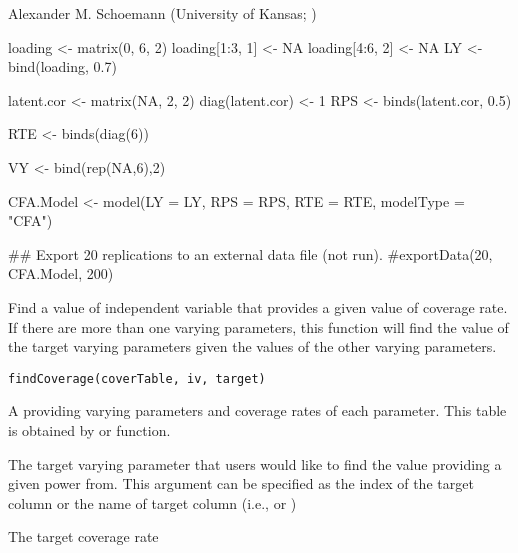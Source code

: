 \documentclass[a4paper]{book}
\begin{document}
%
\begin{Author}\relax
	
Alexander M. Schoemann (University of Kansas; ) 
\end{Author}
%
\begin{Examples}
\begin{ExampleCode}
loading <- matrix(0, 6, 2)
loading[1:3, 1] <- NA
loading[4:6, 2] <- NA
LY <- bind(loading, 0.7)

latent.cor <- matrix(NA, 2, 2)
diag(latent.cor) <- 1
RPS <- binds(latent.cor, 0.5)

RTE <- binds(diag(6))

VY <- bind(rep(NA,6),2)

CFA.Model <- model(LY = LY, RPS = RPS, RTE = RTE, modelType = "CFA")

## Export 20 replications to an external data file (not run).
#exportData(20, CFA.Model, 200)
\end{ExampleCode}
\end{Examples}
%
\begin{Description}\relax
Find a value of independent variable that provides a given value of coverage rate. If there are more than one varying parameters, this function will find the value of the target varying parameters given the values of the other varying parameters.
\end{Description}
%
\begin{Usage}
\begin{verbatim}
findCoverage(coverTable, iv, target)
\end{verbatim}
\end{Usage}
%
\begin{Arguments}
\begin{ldescription}
\item[\code{coverTable}] 
A  providing varying parameters and coverage rates of each parameter. This table is obtained by  or  function.

\item[\code{iv}] 
The target varying parameter that users would like to find the value providing a given power from. This argument can be specified as the index of the target column or the name of target column (i.e.,  or )

\item[\code{target}] 
The target coverage rate

\end{ldescription}
\end{Arguments}
\end{document}

